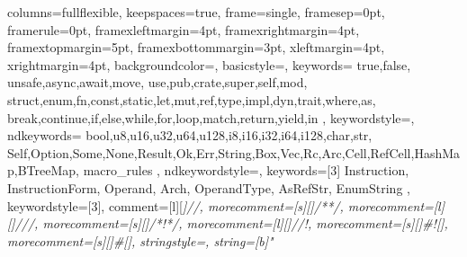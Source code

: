 
\usepackage{color}
\usepackage{listings}
{
    columns=fullflexible,
    keepspaces=true,
    frame=single,
    framesep=0pt,
    framerule=0pt,
    framexleftmargin=4pt,
    framexrightmargin=4pt,
    framextopmargin=5pt,
    framexbottommargin=3pt,
    xleftmargin=4pt,
    xrightmargin=4pt,
    backgroundcolor=\color{GrayCodeBlock},
    basicstyle=\ttfamily\color{BlackText},
    keywords={
        true,false,
        unsafe,async,await,move,
        use,pub,crate,super,self,mod,
        struct,enum,fn,const,static,let,mut,ref,type,impl,dyn,trait,where,as,
        break,continue,if,else,while,for,loop,match,return,yield,in
    },
    keywordstyle=\color{PurpleKeyword},
    ndkeywords={
        bool,u8,u16,u32,u64,u128,i8,i16,i32,i64,i128,char,str,
        Self,Option,Some,None,Result,Ok,Err,String,Box,Vec,Rc,Arc,Cell,RefCell,HashMap,BTreeMap,
        macro_rules
    },
    ndkeywordstyle=\color{RedTypename},
    keywords=[3]{
        Instruction, InstructionForm, Operand, Arch, OperandType,
        AsRefStr, EnumString
    },
    keywordstyle=[3]\color{RedTypename},
    comment=[l][\color{GrayComment}\slshape]{//},
    morecomment=[s][\color{GrayComment}\slshape]{/*}{*/},
    morecomment=[l][\color{GoldDocumentation}\slshape]{///},
    morecomment=[s][\color{GoldDocumentation}\slshape]{/*!}{*/},
    morecomment=[l][\color{GoldDocumentation}\slshape]{//!},
    morecomment=[s][\color{RedTypename}]{\#![}{]},
    morecomment=[s][\color{RedTypename}]{\#[}{]},
    stringstyle=\color{GreenString},
    string=[b]"
}


